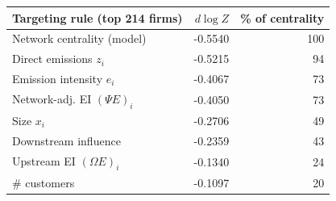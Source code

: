 \begin{tabular}{lrr}
\toprule
Targeting rule (top 214 firms) & $d\log Z$ & \% of centrality \\
\midrule
Network centrality (model) & -0.5540 & 100 \\
Direct emissions $z_i$ & -0.5215 & 94 \\
Emission intensity $e_i$ & -0.4067 & 73 \\
Network-adj. EI $(\Psi E)_i$ & -0.4050 & 73 \\
Size $x_i$ & -0.2706 & 49 \\
Downstream influence & -0.2359 & 43 \\
Upstream EI $(\Omega E)_i$ & -0.1340 & 24 \\
\# customers & -0.1097 & 20 \\
\bottomrule
\end{tabular}
